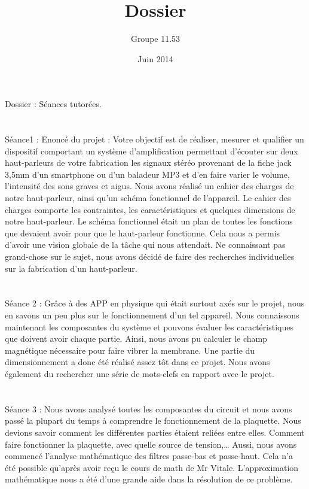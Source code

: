 \documentclass{report}
\title{Dossier}
\author{Groupe 11.53}
\date{Juin 2014}
\begin{document}
 
\maketitle

Dossier : Séances tutorées.

\section{}
Séance1 : Enoncé du projet : Votre objectif est de réaliser, mesurer et qualifier un dispositif comportant un système d’amplification permettant d’écouter sur deux haut-parleurs de votre fabrication les signaux stéréo provenant de la fiche jack 3,5mm d’un smartphone ou d’un baladeur MP3 et d’en faire varier le volume, l’intensité des sons graves et aigus.
Nous avons réalisé un cahier des charges de notre haut-parleur, ainsi qu’un schéma fonctionnel de l’appareil.  Le cahier des charges comporte les contraintes, les caractéristiques et quelques dimensions de notre haut-parleur.  Le schéma fonctionnel était un plan de toutes les fonctions que devaient avoir pour que le haut-parleur fonctionne.  Cela nous a permis d’avoir une vision globale de la tâche qui nous attendait. Ne connaissant pas grand-chose sur le sujet, nous avons décidé de faire des recherches individuelles sur la fabrication d’un haut-parleur.  

\section{}
Séance 2 : Grâce à des APP en physique qui était surtout axés sur le projet, nous en savons un peu plus sur le fonctionnement d’un tel appareil.  Nous connaissons maintenant les composantes du système et pouvons évaluer les caractéristiques que doivent avoir chaque partie.  Ainsi, nous avons pu calculer le champ magnétique nécessaire pour faire vibrer la membrane.  Une partie du dimensionnement a donc été réalisé assez tôt dans ce projet.  Nous avons également du rechercher une série de mots-clefs en rapport avec le projet.

\section{}
Séance 3 : Nous avons analysé toutes les composantes du circuit et nous avons passé la plupart du temps à comprendre le fonctionnement de la plaquette.  Nous devions savoir comment les différentes parties étaient reliées entre elles.  Comment faire fonctionner la plaquette, avec quelle source de tension,…  Aussi, nous avons commencé  l’analyse mathématique des filtres passe-bas et passe-haut.  Cela n’a été possible qu’après avoir reçu le cours de math de Mr Vitale.  L’approximation mathématique nous a été d’une grande aide dans la résolution de ce problème.
\end{document}

